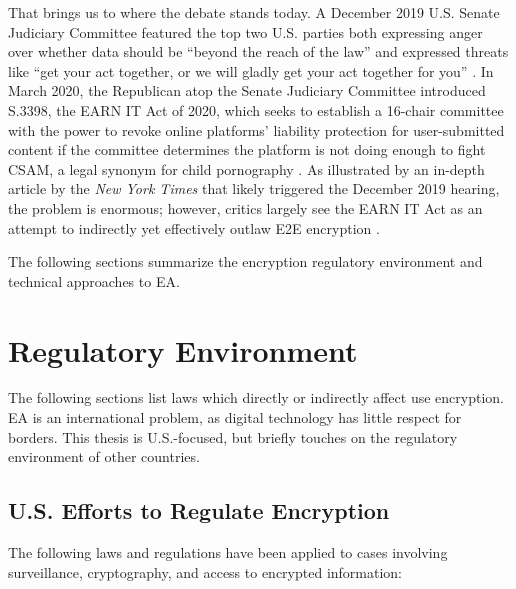 That brings us to where the debate stands today. A December 2019 U.S. Senate Judiciary Committee featured the top two
U.S. parties both expressing anger over whether data should be ``beyond the reach of the law'' and expressed threats
like ``get your act together, or we will gladly get your act together for you'' \cite{geller_2019}. In March 2020, the
Republican atop the Senate Judiciary Committee introduced S.3398, the EARN IT Act of 2020, which seeks to establish a
16-chair committee with the power to revoke online platforms' liability protection for user-submitted content if the
committee determines the platform is not doing enough to fight \ac{CSAM}, a legal synonym for
child pornography \cite{graham_s3398_2020}. As illustrated by an in-depth article by the \textit{New York Times}
\cite{keller_internet_2019} that likely triggered the December 2019 hearing, the problem is enormous; however, critics
largely see the EARN IT Act as an attempt to indirectly yet effectively outlaw \ac{E2E} encryption \cite{newman_2020}
\cite{pfefferkorn_2020}.


The following sections summarize the encryption regulatory environment and technical approaches to \ac{EA}.



\section{Regulatory Environment}
\label{sec-reg-environment}

The following sections list laws which directly or indirectly affect use encryption. \Ac{EA} is an international
problem, as digital technology has little respect for borders. This thesis is U.S.-focused, but briefly touches on the
regulatory environment of other countries.


\subsection{U.S. Efforts to Regulate Encryption}

The following laws and regulations have been applied to cases involving surveillance, cryptography, and access to
encrypted information:

\newcommand{\lawsstart}{\begin{itemize}}
\newcommand{\law}[4]{ %
    \item #1: \textbf{#2} \cite{#3} \newline
    \parbox{\linewidth}{#4} \newline
}
\newcommand{\lawsend}{\end{itemize}}


